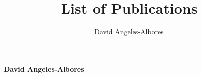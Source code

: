 \documentclass[a4paper,skipsamekey,11pt,english]{curve}
\title{List of Publications}
\author{David Angeles-Albores}
\begin{document}
\maketitle{}

\begin{center}
  \Large\bfseries\sffamily David Angeles-Albores
\end{center}


\end{document}
